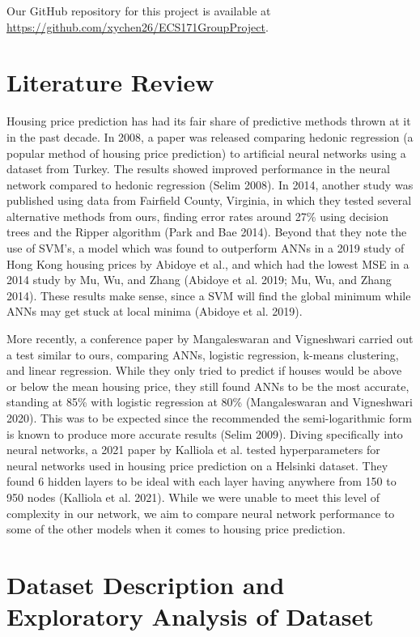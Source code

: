 \documentclass[12pt]{article}
\begin{document}
	Our GitHub repository for this project is available at \url{https://github.com/xychen26/ECS171GroupProject}.
	
	\section{Literature Review}
		
	Housing price prediction has had its fair share of predictive methods thrown at it in the past decade. In 2008, a paper was released comparing hedonic regression (a popular method of housing price prediction) to artificial neural networks using a dataset from Turkey. The results showed improved performance in the neural network compared to hedonic regression (Selim 2008). In 2014, another study was published using data from Fairfield County, Virginia, in which they tested several alternative methods from ours, finding error rates around 27\% using decision trees and the Ripper algorithm (Park and Bae 2014). Beyond that they note the use of SVM’s, a model which was found to outperform ANNs in a 2019 study of Hong Kong housing prices by Abidoye et al., and which had the lowest MSE in a 2014 study by Mu, Wu, and Zhang (Abidoye et al. 2019; Mu, Wu, and Zhang 2014). These results make sense, since a SVM will find the global minimum while ANNs may get stuck at local minima (Abidoye et al. 2019).
	
	More recently, a conference paper by Mangaleswaran and Vigneshwari carried out a test similar to ours, comparing ANNs, logistic regression, k-means clustering, and linear regression. While they only tried to predict if houses would be above or below the mean housing price, they still found ANNs to be the most accurate, standing at 85\% with logistic regression at 80\% (Mangaleswaran and Vigneshwari 2020). This was to be expected since the recommended the semi-logarithmic form is known to produce more accurate results (Selim 2009). Diving specifically into neural networks, a 2021 paper by Kalliola et al. tested hyperparameters for neural networks used in housing price prediction on a Helsinki dataset. They found 6 hidden layers to be ideal with each layer having anywhere from 150 to 950 nodes (Kalliola et al. 2021). While we were unable to meet this level of complexity in our network, we aim to compare neural network performance to some of the other models when it comes to housing price prediction.
	
	\section{Dataset Description and Exploratory Analysis of Dataset}
	
\end{document}
